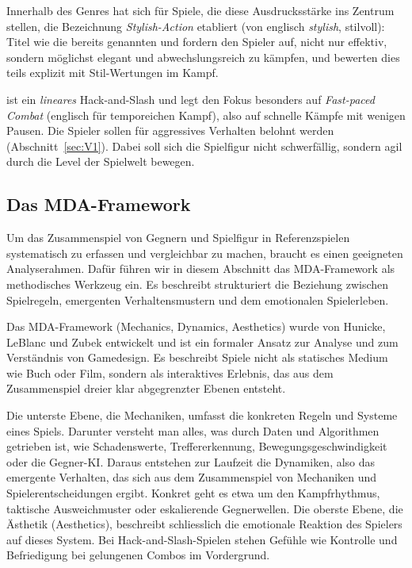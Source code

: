 \documentclass[../Main.tex]{subfiles}
\begin{document}
Innerhalb des Genres hat sich für Spiele, die diese Ausdrucksstärke ins Zentrum stellen, die Bezeichnung \textit{Stylish-Action} etabliert (von englisch \textit{stylish}, stilvoll): Titel wie die bereits genannten  und  fordern den Spieler auf, nicht nur effektiv, sondern möglichst elegant und abwechslungsreich zu kämpfen, und bewerten dies teils explizit mit Stil-Wertungen im Kampf.

 ist ein \textit{lineares} Hack-and-Slash und legt den Fokus besonders auf \textit{Fast-paced Combat} (englisch für temporeichen Kampf), also auf schnelle Kämpfe mit wenigen Pausen. Die Spieler sollen für aggressives Verhalten belohnt werden (Abschnitt~\ref{sec:V1}). Dabei soll sich die Spielfigur nicht schwerfällig, sondern agil durch die Level der Spielwelt bewegen.

\subsection{Das MDA-Framework} \label{sec:MDA}
Um das Zusammenspiel von Gegnern und Spielfigur in Referenzspielen systematisch zu erfassen und vergleichbar zu machen, braucht es einen geeigneten Analyserahmen. Dafür führen wir in diesem Abschnitt das MDA-Framework als methodisches Werkzeug ein. Es beschreibt strukturiert die Beziehung zwischen Spielregeln, emergenten Verhaltensmustern und dem emotionalen Spielerleben.

Das MDA-Framework (Mechanics, Dynamics, Aesthetics) wurde von Hunicke, LeBlanc und Zubek entwickelt und ist ein formaler Ansatz zur Analyse und zum Verständnis von Gamedesign. Es beschreibt Spiele nicht als statisches Medium wie Buch oder Film, sondern als interaktives Erlebnis, das aus dem Zusammenspiel dreier klar abgegrenzter Ebenen entsteht.\autocite[\textcolor{red}{S.~??}]{hunicke2004mda}

Die unterste Ebene, die Mechaniken, umfasst die konkreten Regeln und Systeme eines Spiels. Darunter versteht man alles, was durch Daten und Algorithmen getrieben ist, wie Schadenswerte, Treffererkennung, Bewegungsgeschwindigkeit oder die Gegner-KI. Daraus entstehen zur Laufzeit die Dynamiken, also das emergente Verhalten, das sich aus dem Zusammenspiel von Mechaniken und Spielerentscheidungen ergibt. Konkret geht es etwa um den Kampfrhythmus, taktische Ausweichmuster oder eskalierende Gegnerwellen. Die oberste Ebene, die Ästhetik (Aesthetics), beschreibt schliesslich die emotionale Reaktion des Spielers auf dieses System. Bei Hack-and-Slash-Spielen stehen Gefühle wie Kontrolle und Befriedigung bei gelungenen Combos im Vordergrund.
\end{document}
